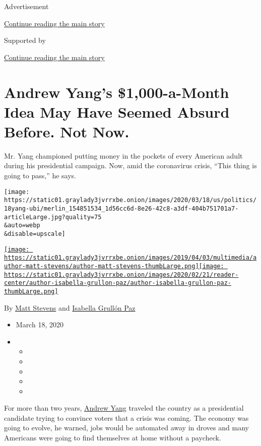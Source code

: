 Advertisement

\protect\hyperlink{after-top}{Continue reading the main story}

Supported by

\protect\hyperlink{after-sponsor}{Continue reading the main story}

\hypertarget{andrew-yangs-1000-a-month-idea-may-have-seemed-absurd-before-not-now}{%
\section{Andrew Yang's \$1,000-a-Month Idea May Have Seemed Absurd
Before. Not
Now.}\label{andrew-yangs-1000-a-month-idea-may-have-seemed-absurd-before-not-now}}

Mr. Yang championed putting money in the pockets of every American adult
during his presidential campaign. Now, amid the coronavirus crisis,
``This thing is going to pass,'' he says.

\texttt{[image: https://static01.graylady3jvrrxbe.onion/images/2020/03/18/us/politics/18yang-ubi/merlin\_154851534\_1d56cc6d-8e26-42c8-a3df-404b751701a7-articleLarge.jpg?quality=75\\\&auto=webp\\\&disable=upscale]}

\href{https://www.nytimes3xbfgragh.onion/by/matt-stevens}{\texttt{[image: https://static01.graylady3jvrrxbe.onion/images/2019/04/03/multimedia/author-matt-stevens/author-matt-stevens-thumbLarge.png]}}\href{https://www.nytimes3xbfgragh.onion/by/isabella-grullon-paz}{\texttt{[image: https://static01.graylady3jvrrxbe.onion/images/2020/02/21/reader-center/author-isabella-grullon-paz/author-isabella-grullon-paz-thumbLarge.png]}}

By \href{https://www.nytimes3xbfgragh.onion/by/matt-stevens}{Matt
Stevens} and
\href{https://www.nytimes3xbfgragh.onion/by/isabella-grullon-paz}{Isabella
Grullón Paz}

\begin{itemize}
\item
  March 18, 2020
\item
  \begin{itemize}
  \item
  \item
  \item
  \item
  \item
  \end{itemize}
\end{itemize}

For more than two years,
\href{https://www.nytimes3xbfgragh.onion/2020/04/29/nyregion/andrew-yang-mayor-nyc.html}{Andrew
Yang} traveled the country as a presidential candidate trying to
convince voters that a crisis was coming. The economy was going to
evolve, he warned, jobs would be automated away in droves and many
Americans were going to find themselves at home without a paycheck.

